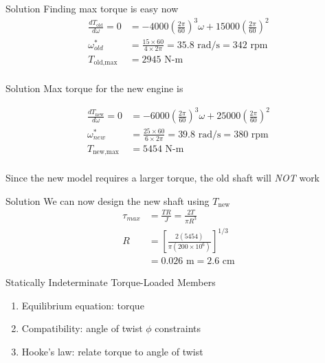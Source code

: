 \documentclass[10pt, svgnames]{beamer}
\begin{document}
\begin{frame}[label={sec:orgad4c51d}]{Solution Finding max torque is easy now}
\begin{align*}
    \frac{dT_{\text{old}}}{d\omega} = 0 &= -4000 (\frac{2\pi}{60})^{3} \omega + 15000 (\frac{2\pi}{60})^{2}\\
    \omega_{old}^{*} &= \frac{15 \times 60}{4 \times 2\pi} = 35.8 \text{ rad/s} = 342 \text{ rpm} \\
    T_{\text{old,} \max} &= 2945 \text{ N-m} \\
\end{align*}
\end{frame}

\begin{frame}[label={sec:org48aa396}]{Solution}
Max torque for the new engine is

\begin{align*}
    \frac{dT_{\text{new}}}{d\omega} = 0 &= -6000 (\frac{2\pi}{60})^{3} \omega + 25000 (\frac{2\pi}{60})^{2}\\
    \omega_{new}^{*} &= \frac{25 \times 60}{6 \times 2\pi} = 39.8 \text{ rad/s} = 380 \text{ rpm} \\
    T_{\text{new,} \max} &= 5454 \text{ N-m} \\
\end{align*}

Since the new model requires a larger torque, the old shaft will \emph{NOT}
work
\end{frame}

\begin{frame}[label={sec:org4a20c56}]{Solution}
We can now design the new shaft using \(T_{\text{new}}\)
\begin{align*}
    \tau_{max} &= \frac{TR}{J} = \frac{2T}{\pi R^{3}} \\
    R &= \left[ \frac{2(5454)}{\pi ( 200 \times 10^{6} )} \right]^{1/3} \\
               &= 0.026 \text{ m} = 2.6 \text{ cm}
\end{align*}

Statically Indeterminate Torque-Loaded Members

\begin{enumerate}
\item Equilibrium equation: torque

\item Compatibility: angle of twist \(\phi\) constraints

\item Hooke's law: relate torque to angle of twist
\end{enumerate}
\end{frame}
\end{document}
